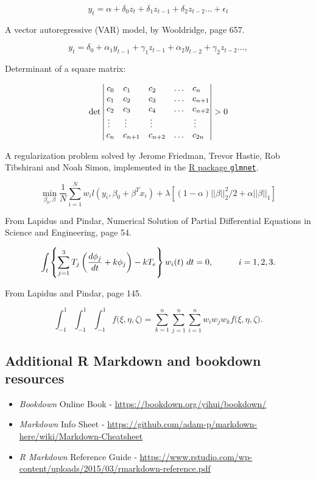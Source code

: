 \documentclass[12pt,oneside]{chicagocapstone}
\begin{document}
\[ y_t = \alpha + \delta_0 z_t + \delta_1 z_{t-1} + \delta_2 z_{t-2} \ldots + \epsilon_t\]

A vector autoregressive (VAR) model, by Wooldridge, page 657.

\[ y_t = \delta_0 + \alpha_1 y_{t-1} + \gamma_1 z_{t-1} + \alpha_2 y_{t-2} + \gamma_2 z_{t-2} \ldots,\]
\newpage

Determinant of a square matrix:

\[\det\left|\,\begin{matrix}%
c_0&c_1\hfill&c_2\hfill&\ldots&c_n\hfill\cr
c_1&c_2\hfill&c_3\hfill&\ldots&c_{n+1}\hfill\cr
c_2&c_3\hfill&c_4\hfill&\ldots&c_{n+2}\hfill\cr
\,\vdots\hfill&\,\vdots\hfill&
  \,\vdots\hfill&&\,\vdots\hfill\cr
c_n&c_{n+1}\hfill&c_{n+2}\hfill&\ldots&c_{2n}\hfill\cr
\end{matrix}\right|>0\]
\bigskip

A regularization problem solved by Jerome Friedman, Trevor Hastie, Rob
Tibshirani and Noah Simon, implemented in the
\href{https://cran.r-project.org/web/packages/glmnet/index.html}{R
package \texttt{glmnet}}.

\[ \min_{\beta_0,\beta} \frac{1}{N}\sum_{i=1}^N w_il(y_i,\beta_0+\beta^Tx_i)+\lambda \left[(1-\alpha) ||\beta||_2^2/2+\alpha||\beta||_1\right]\]

\bigskip

From Lapidus and Pindar, Numerical Solution of Partial Differential
Equations in Science and Engineering, page 54.

\[\int_t\left\{\sum_{j=1}^3 T_j \left({d\phi_j\over dt}+k\phi_j\right)-kT_e\right\}w_i(t)\ dt=0, \qquad\quad i=1,2,3.\]

\bigskip

From Lapidus and Pindar, page 145.

\[\int_{-1}^1\!\int_{-1}^1\!\int_{-1}^1 f\big(\xi,\eta,\zeta\big) = \sum_{k=1}^n\sum_{j=1}^n\sum_{i=1}^n w_i w_j w_k f\big( \xi,\eta,\zeta\big).\]

\subsection*{Additional R Markdown and bookdown
resources}\label{additional-r-markdown-and-bookdown-resources}
\begin{itemize}
\item
  \emph{Bookdown} Online Book -
  \url{https://bookdown.org/yihui/bookdown/}
\item
  \emph{Markdown} Info Sheet -
  \url{https://github.com/adam-p/markdown-here/wiki/Markdown-Cheatsheet}
\item
  \emph{R Markdown} Reference Guide -
  \url{https://www.rstudio.com/wp-content/uploads/2015/03/rmarkdown-reference.pdf}
\end{itemize}
\end{document}
